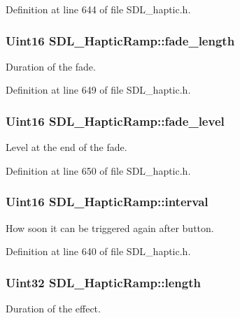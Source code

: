 Definition at line 644 of file S\+D\+L\+\_\+haptic.\+h.

\hypertarget{structSDL__HapticRamp_ad58a8f7cfdf659b45f0503fc56db7436}{
\subsubsection[{fade\+\_\+length}]{\setlength{\rightskip}{0pt plus 5cm}Uint16 S\+D\+L\+\_\+\+Haptic\+Ramp\+::fade\+\_\+length}}\label{structSDL__HapticRamp_ad58a8f7cfdf659b45f0503fc56db7436}
Duration of the fade. 

Definition at line 649 of file S\+D\+L\+\_\+haptic.\+h.

\hypertarget{structSDL__HapticRamp_a66b586f2e6a23a085a7b2854f61752c5}{
\subsubsection[{fade\+\_\+level}]{\setlength{\rightskip}{0pt plus 5cm}Uint16 S\+D\+L\+\_\+\+Haptic\+Ramp\+::fade\+\_\+level}}\label{structSDL__HapticRamp_a66b586f2e6a23a085a7b2854f61752c5}
Level at the end of the fade. 

Definition at line 650 of file S\+D\+L\+\_\+haptic.\+h.

\hypertarget{structSDL__HapticRamp_a4b89d108cfa7e96ea58b58771334c33d}{
\subsubsection[{interval}]{\setlength{\rightskip}{0pt plus 5cm}Uint16 S\+D\+L\+\_\+\+Haptic\+Ramp\+::interval}}\label{structSDL__HapticRamp_a4b89d108cfa7e96ea58b58771334c33d}
How soon it can be triggered again after button. 

Definition at line 640 of file S\+D\+L\+\_\+haptic.\+h.

\hypertarget{structSDL__HapticRamp_a57e75237507701405af2a3caf34cdb5a}{
\subsubsection[{length}]{\setlength{\rightskip}{0pt plus 5cm}Uint32 S\+D\+L\+\_\+\+Haptic\+Ramp\+::length}}\label{structSDL__HapticRamp_a57e75237507701405af2a3caf34cdb5a}
Duration of the effect. 

